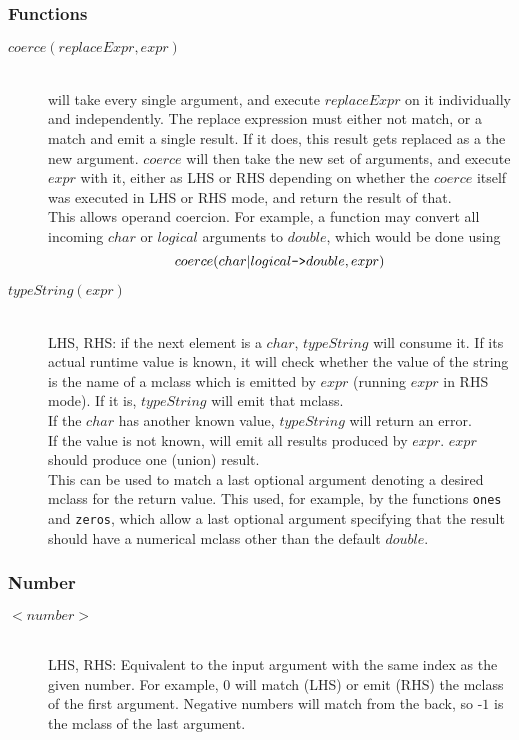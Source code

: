 \subsubsection{Functions}
\begin{description}
\item[$coerce(replaceExpr, expr)$] \hfill \\
  will take every single argument, and execute $replaceExpr$ on it
  individually and independently. The replace expression must either
  not match, or a match and emit a single result. If it does, this
  result gets replaced as a the new argument. 
  $coerce$ will then take the new set of arguments, and execute 
  $expr$ with it, either as LHS or RHS depending on whether
  the $coerce$ itself was executed in LHS or RHS mode, and return the result
  of that.\\
  This allows operand coercion. For example, a function may convert all
  incoming $char$ or $logical$ arguments to $double$, which would be done using
\vspace{-.3cm} \begin{equation*}
    coerce(char|logical\text{{\tt ->}}double, expr)
\end{equation*}


\item[$typeString(expr)$] \hfill \\ LHS, RHS: if the next element is a
  $char$, $typeString$ will consume it. If its actual runtime value is
  known, it will check whether the value of the string is the name of
  a mclass which is emitted by $expr$ (running $expr$ in RHS mode).
  If it is, $typeString$ will emit that mclass.\\
  If the $char$ has another known value, $typeString$
  will return an error.\\
  If the value is not known, will emit all results
  produced by $expr$. $expr$ should produce one (union) result.\\
  This can be used to match a last optional argument denoting a
  desired mclass for the return value. This used, for example, by the
  functions {\tt ones} and {\tt zeros}, which allow a last 
  optional argument specifying that the result should have a
  numerical mclass other than the default $double$.
\end{description}

\subsubsection{Number}
\begin{description}
\item[$<number>$] \hfill \\
  LHS, RHS: Equivalent to the input argument with the same index as
  the given number. For example, $0$ will match (LHS) or emit (RHS)
  the mclass of the first argument.  Negative numbers will match from
  the back, so -$1$ is the mclass of the last argument.
\end{description}

